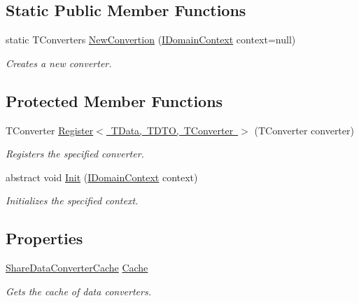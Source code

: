 \subsection*{Static Public Member Functions}
\begin{DoxyCompactItemize}
\item 
static T\+Converters \mbox{\hyperlink{class_bar_none_1_1_shared_1_1_data_converter_1_1_core_1_1_base_converter_acaee80d822a2beafe77941615a0bbf78}{New\+Convertion}} (\mbox{\hyperlink{interface_bar_none_1_1_shared_1_1_core_1_1_i_domain_context}{I\+Domain\+Context}} context=null)
\begin{DoxyCompactList}\small\item\em Creates a new converter. \end{DoxyCompactList}\end{DoxyCompactItemize}
\subsection*{Protected Member Functions}
\begin{DoxyCompactItemize}
\item 
T\+Converter \mbox{\hyperlink{class_bar_none_1_1_shared_1_1_data_converter_1_1_core_1_1_base_converter_a18cccd9a951fe46931311fbfe8c2bc1c}{Register$<$ T\+Data, T\+D\+T\+O, T\+Converter $>$}} (T\+Converter converter)
\begin{DoxyCompactList}\small\item\em Registers the specified converter. \end{DoxyCompactList}\item 
abstract void \mbox{\hyperlink{class_bar_none_1_1_shared_1_1_data_converter_1_1_core_1_1_base_converter_a574f398eafa83f0fc3bd5f69ac344850}{Init}} (\mbox{\hyperlink{interface_bar_none_1_1_shared_1_1_core_1_1_i_domain_context}{I\+Domain\+Context}} context)
\begin{DoxyCompactList}\small\item\em Initializes the specified context. \end{DoxyCompactList}\end{DoxyCompactItemize}
\subsection*{Properties}
\begin{DoxyCompactItemize}
\item 
\mbox{\hyperlink{class_bar_none_1_1_shared_1_1_data_converter_1_1_core_1_1_share_data_converter_cache}{Share\+Data\+Converter\+Cache}} \mbox{\hyperlink{class_bar_none_1_1_shared_1_1_data_converter_1_1_core_1_1_base_converter_a272d16077d3d7753fab1649b57288f5e}{Cache}}
\begin{DoxyCompactList}\small\item\em Gets the cache of data converters. \end{DoxyCompactList}\end{DoxyCompactItemize}
